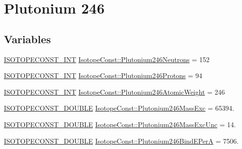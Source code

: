 \hypertarget{group___isotope_const-_plutonium-_pu246}{}\section{Plutonium 246}
\label{group___isotope_const-_plutonium-_pu246}
\subsection*{Variables}
\begin{DoxyCompactItemize}
\item 
\mbox{\hyperlink{group___isotope_const-_macros_ga5f18360b3e99483a35c32d789e62621c}{I\+S\+O\+T\+O\+P\+E\+C\+O\+N\+S\+T\+\_\+\+I\+NT}} \mbox{\hyperlink{group___isotope_const-_plutonium-_pu246_gabd83498f3c3540ad0129530b3e499549}{Isotope\+Const\+::\+Plutonium246\+Neutrons}} = 152
\item 
\mbox{\hyperlink{group___isotope_const-_macros_ga5f18360b3e99483a35c32d789e62621c}{I\+S\+O\+T\+O\+P\+E\+C\+O\+N\+S\+T\+\_\+\+I\+NT}} \mbox{\hyperlink{group___isotope_const-_plutonium-_pu246_ga86d38f0e5b4ee46819af7ac301ea8c5e}{Isotope\+Const\+::\+Plutonium246\+Protons}} = 94
\item 
\mbox{\hyperlink{group___isotope_const-_macros_ga5f18360b3e99483a35c32d789e62621c}{I\+S\+O\+T\+O\+P\+E\+C\+O\+N\+S\+T\+\_\+\+I\+NT}} \mbox{\hyperlink{group___isotope_const-_plutonium-_pu246_gaa60fcc0ded2e24c981eaa7281117309a}{Isotope\+Const\+::\+Plutonium246\+Atomic\+Weight}} = 246
\item 
\mbox{\hyperlink{group___isotope_const-_macros_ga8f45a7272ce02c0b4c65c44636ed719a}{I\+S\+O\+T\+O\+P\+E\+C\+O\+N\+S\+T\+\_\+\+D\+O\+U\+B\+LE}} \mbox{\hyperlink{group___isotope_const-_plutonium-_pu246_gab78550812cd6619378778340a3cc22ae}{Isotope\+Const\+::\+Plutonium246\+Mass\+Exc}} = 65394.
\item 
\mbox{\hyperlink{group___isotope_const-_macros_ga8f45a7272ce02c0b4c65c44636ed719a}{I\+S\+O\+T\+O\+P\+E\+C\+O\+N\+S\+T\+\_\+\+D\+O\+U\+B\+LE}} \mbox{\hyperlink{group___isotope_const-_plutonium-_pu246_ga30db4a7e976269e6f8203a0127330727}{Isotope\+Const\+::\+Plutonium246\+Mass\+Exc\+Unc}} = 14.
\item 
\mbox{\hyperlink{group___isotope_const-_macros_ga8f45a7272ce02c0b4c65c44636ed719a}{I\+S\+O\+T\+O\+P\+E\+C\+O\+N\+S\+T\+\_\+\+D\+O\+U\+B\+LE}} \mbox{\hyperlink{group___isotope_const-_plutonium-_pu246_ga6d670e26eed3ffe7d6f1cb70786ec358}{Isotope\+Const\+::\+Plutonium246\+Bind\+E\+PerA}} = 7506.
\item 

\end{DoxyCompactItemize}
